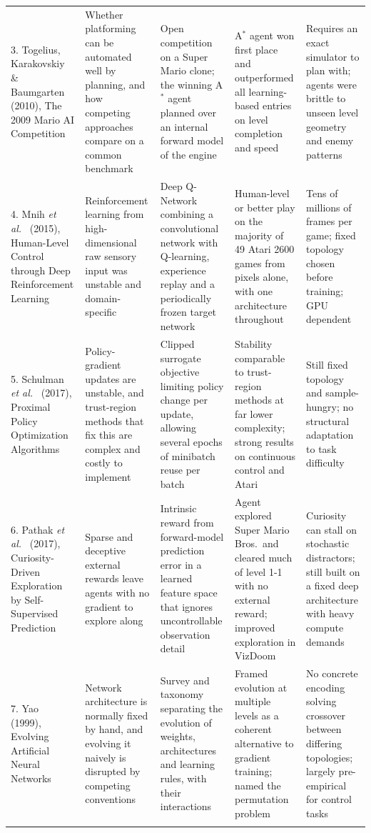 \begin{longtable}{@{}R{0.175\textwidth} R{0.185\textwidth} R{0.185\textwidth} R{0.185\textwidth} R{0.185\textwidth}@{}}
3. Togelius, Karakovskiy \& Baumgarten~\cite{togelius2010} (2010), The 2009 Mario AI Competition &
Whether platforming can be automated well by planning, and how competing
approaches compare on a common benchmark &
Open competition on a Super Mario clone; the winning A$^*$ agent planned over
an internal forward model of the engine &
A$^*$ agent won first place and outperformed all learning-based entries on
level completion and speed &
Requires an exact simulator to plan with; agents were brittle to unseen level
geometry and enemy patterns \\
\addlinespace

4. Mnih \emph{et al.}~\cite{mnih2015} (2015), Human-Level Control through Deep Reinforcement Learning &
Reinforcement learning from high-dimensional raw sensory input was unstable and
domain-specific &
Deep Q-Network combining a convolutional network with Q-learning, experience
replay and a periodically frozen target network &
Human-level or better play on the majority of 49 Atari 2600 games from pixels
alone, with one architecture throughout &
Tens of millions of frames per game; fixed topology chosen before training; GPU
dependent \\
\addlinespace

5. Schulman \emph{et al.}~\cite{schulman2017} (2017), Proximal Policy Optimization Algorithms &
Policy-gradient updates are unstable, and trust-region methods that fix this
are complex and costly to implement &
Clipped surrogate objective limiting policy change per update, allowing several
epochs of minibatch reuse per batch &
Stability comparable to trust-region methods at far lower complexity; strong
results on continuous control and Atari &
Still fixed topology and sample-hungry; no structural adaptation to task
difficulty \\
\addlinespace

6. Pathak \emph{et al.}~\cite{pathak2017} (2017), Curiosity-Driven Exploration by Self-Supervised
Prediction &
Sparse and deceptive external rewards leave agents with no gradient to explore
along &
Intrinsic reward from forward-model prediction error in a learned feature space
that ignores uncontrollable observation detail &
Agent explored Super Mario Bros.\ and cleared much of level 1-1 with no
external reward; improved exploration in VizDoom &
Curiosity can stall on stochastic distractors; still built on a fixed deep
architecture with heavy compute demands \\
\addlinespace

7. Yao~\cite{yao1999} (1999), Evolving Artificial Neural Networks &
Network architecture is normally fixed by hand, and evolving it naively is
disrupted by competing conventions &
Survey and taxonomy separating the evolution of weights, architectures and
learning rules, with their interactions &
Framed evolution at multiple levels as a coherent alternative to gradient
training; named the permutation problem &
No concrete encoding solving crossover between differing topologies; largely
pre-empirical for control tasks \\
\addlinespace


\end{longtable}
